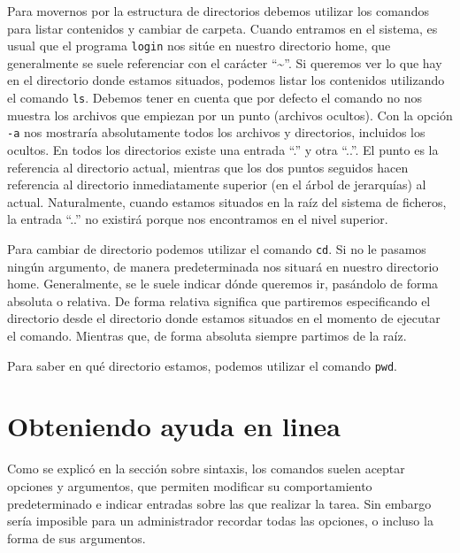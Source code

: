 \documentclass[12pt]{article}
\begin{document}
Para movernos por la estructura de directorios debemos utilizar los comandos para 
listar contenidos y cambiar de carpeta. Cuando entramos en el sistema, es usual 
que el programa \texttt{login} nos sitúe en nuestro directorio home, que generalmente se suele 
referenciar con el carácter ``\textasciitilde''. Si queremos ver lo que hay en el 
directorio donde estamos situados, podemos listar los contenidos utilizando el 
comando \texttt{ls}. Debemos tener en cuenta que por defecto el comando no nos muestra los 
archivos que empiezan por un punto (archivos ocultos). Con la opción \texttt{-a} nos mostraría 
absolutamente todos los archivos y directorios, incluidos los ocultos. En todos los directorios existe una entrada 
``.'' y otra ``..''. El punto es la referencia al directorio actual, mientras 
que los dos puntos seguidos hacen referencia al directorio inmediatamente superior 
(en el árbol de jerarquías) al actual. Naturalmente, cuando estamos situados en 
la raíz del sistema de ficheros, la entrada ``..'' no existirá porque nos encontramos 
en el nivel superior.

Para cambiar de directorio podemos utilizar el comando \texttt{cd}. Si no le pasamos ningún argumento, 
de manera predeterminada nos situará en nuestro directorio home. Generalmente, se le suele indicar 
dónde queremos ir, pasándolo de forma absoluta o relativa. De forma relativa significa que partiremos 
especificando el directorio desde el directorio donde estamos situados en el momento de ejecutar el comando. 
Mientras que, de forma absoluta siempre partimos de la raíz.


Para saber en qué directorio estamos, podemos utilizar el comando \texttt{pwd}.

\section{Obteniendo ayuda en linea}
Como se explicó en la sección sobre sintaxis, los comandos suelen aceptar opciones y argumentos, 
que permiten modificar su comportamiento predeterminado e indicar entradas sobre las que 
realizar la tarea. Sin embargo sería imposible para un administrador recordar todas las opciones, 
o incluso la forma de sus argumentos. 
\end{document}
